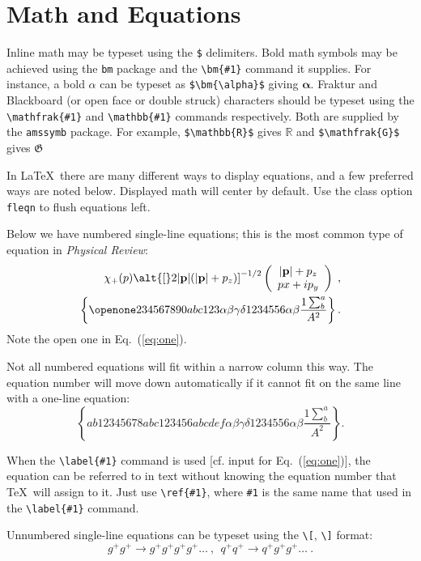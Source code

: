 \documentclass[%
 reprint,
 amsmath,amssymb,
 aps,
]{revtex4-2}
\begin{document}
\section{Math and Equations}
Inline math may be typeset using the \verb+$+ delimiters. Bold math
symbols may be achieved using the \verb+bm+ package and the
\verb+\bm{#1}+ command it supplies. For instance, a bold $\alpha$ can
be typeset as \verb+$\bm{\alpha}$+ giving $\bm{\alpha}$. Fraktur and
Blackboard (or open face or double struck) characters should be
typeset using the \verb+\mathfrak{#1}+ and \verb+\mathbb{#1}+ commands
respectively. Both are supplied by the \texttt{amssymb} package. For
example, \verb+$\mathbb{R}$+ gives $\mathbb{R}$ and
\verb+$\mathfrak{G}$+ gives $\mathfrak{G}$

In \LaTeX\ there are many different ways to display equations, and a
few preferred ways are noted below. Displayed math will center by
default. Use the class option \verb+fleqn+ to flush equations left.

Below we have numbered single-line equations; this is the most common
type of equation in \textit{Physical Review}:
\begin{eqnarray}
  \chi_+(p)\alt{\bf [}2|{\bf p}|(|{\bf p}|+p_z){\bf ]}^{-1/2}
  \left(
    \begin{array}{c}
      |{\bf p}|+p_z\\
      px+ip_y
  \end{array}\right)\;,
  \\
  \left\{%
    \openone234567890abc123\alpha\beta\gamma\delta1234556\alpha\beta
    \frac{1\sum^{a}_{b}}{A^2}%
  \right\}%
  \label{eq:one}.
\end{eqnarray}
Note the open one in Eq.~(\ref{eq:one}).

Not all numbered equations will fit within a narrow column this
way. The equation number will move down automatically if it cannot fit
on the same line with a one-line equation:
\begin{equation}
  \left\{
    ab12345678abc123456abcdef\alpha\beta\gamma\delta1234556\alpha\beta
    \frac{1\sum^{a}_{b}}{A^2}%
  \right\}.
\end{equation}

When the \verb+\label{#1}+ command is used [cf. input for
Eq.~(\ref{eq:one})], the equation can be referred to in text without
knowing the equation number that \TeX\ will assign to it. Just
use \verb+\ref{#1}+, where \verb+#1+ is the same name that used in
the \verb+\label{#1}+ command.

Unnumbered single-line equations can be typeset
using the \verb+\[+, \verb+\]+ format:
\[g^+g^+ \rightarrow g^+g^+g^+g^+ \dots ~,~~q^+q^+\rightarrow
q^+g^+g^+ \dots ~. \]
\end{document}
